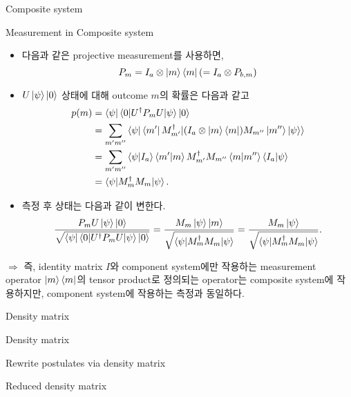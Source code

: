 \documentclass[9pt]{beamer}
\begin{document}
\begin{section}{Composite system}
        \begin{frame}{Measurement in Composite system}
            \begin{itemize}
                \item 다음과 같은 projective measurement를 사용하면,
                $$P_{m} = I_a \otimes \ket m \bra m (= I_a \otimes P_{b,m})$$
                \item $U\ket \psi \ket 0$ 상태에 대해 outcome $m$의 확률은 다음과 같고
                \begin{align*} 
                    p(m) &= \bra{\psi}\braket{0|U^\dagger P_m U| \psi} \ket 0 \\ &= \sum_{m'm''} \braket{\psi|\bra{m'} M_{m'}^\dagger |(I_a \otimes \ket m \bra m) M_{m''} \ket{m''} \ket{\psi}} \\ &= \sum_{m'm''} \braket{\psi|I_a} \braket{m'|m} M_{m'}^\dagger M_{m''}\braket{m|m''} \braket{I_a|\psi} \\
                    &= \braket{\psi|M_m^\dagger M_m | \psi}.
                \end{align*}
                \item 측정 후 상태는 다음과 같이 변한다.
                $$ \frac{P_m U \ket{ \psi} \ket 0}{\sqrt{\bra \psi \braket{0|U^\dagger P_mU|\psi} \ket 0}} = \frac{M_m \ket{\psi} \ket m}{\sqrt{\braket{\psi|M_m^\dagger M_m |\psi}}}  = \frac{M_m \ket{\psi}}{ \sqrt{\braket{\psi|M^\dagger_m M_m | \psi}}}. $$
            \end{itemize}
            $\Rightarrow$ 즉, identity matrix $I$와 component system에만 작용하는 measurement operator $\ket m \bra m$의 tensor product로 정의되는 operator는 composite system에 작용하지만, component system에 작용하는 측정과 동일하다.  
        \end{frame}
    \end{section}

    \begin{section}{Density matrix}
        \begin{frame}{Density matrix}
        \end{frame}

        \begin{frame}{Rewrite postulates via density matrix}
        \end{frame}

        \begin{frame}{Reduced density matrix}
        \end{frame}
    \end{section}
\end{document}
